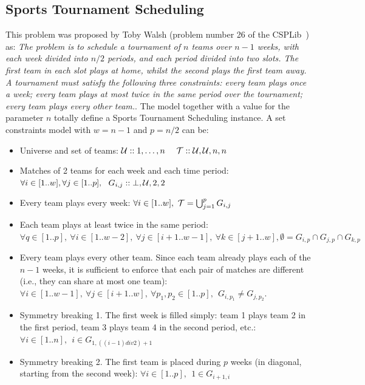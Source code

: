 \documentclass[3p,authoryear,times]{elsarticle}
\begin{document}
\subsection{Sports Tournament Scheduling}
\label{sts}
\color{red}
This problem was proposed by Toby Walsh (problem number 26 of the CSPLib~\cite{sts}) as: 
\textit{The problem is to schedule a tournament of $n$ teams over $n−1$ weeks, with each week divided into $n/2$ periods, and each period divided into two slots. The first team in each slot plays at home, whilst the second plays the first team away. A tournament must satisfy the following three constraints: every team plays once a week; every team plays at most twice in the same period over the tournament; every team plays every other team.}. 
The model together with a value for the parameter $n$ totally define a Sports Tournament Scheduling instance. 
A set constraints model with $w=n−1$ and $p=n/2$ can be:
\begin{itemize}
\item Universe and set of teams: ${\cal U}::1,\ldots,n~~~~{\cal T}::{\cal U},{\cal U},n,n$


\item{Matches of 2 teams for each week and each time period:}
$\forall i \in [1..w], \forall j \in [1..p], ~~ G_{i,j}::\bot,{\cal U},2,2 $

\item{Every team plays every week:} $\forall i \in [1..w],  ~{\cal T} = \bigcup_{j=1}^{p} G_{i,j} $


\item{Each team plays at least twice in the same period:}
$\forall q \in [1..p],  ~\forall i \in [1..w-2],  ~ \forall j \in [i+1..w-1],  ~ \forall k \in [j+1..w], \emptyset =  G_{i,p} \cap G_{j,p} \cap G_{k,p} $

\item{Every team plays every other team.} 
Since each team already plays each of the $n-1$ weeks, it is sufficient to enforce that each pair of matches are different (i.e., they can share at most one team):
$\forall i \in [1..w-1],  ~ \forall j \in [i+1..w],  ~ \forall p_1,p_2 \in [1..p], ~~ G_{i,p_1} \not = G_{j,p_2}$. 


\item{Symmetry breaking 1.} 
The first week is filled simply: team 1 plays team 2 in the first period, team 3 plays team 4 in the second period, etc.:
$\forall i \in [1..n], ~~ i \in   G_{1,((i-1) div 2)+1} $

\item{Symmetry breaking 2.} 
The first team is placed during $p$ weeks (in diagonal, starting from the second week):
$\forall i \in [1..p], ~~ 1 \in   G_{i+1,i}$
\end{itemize}
\color{black}
\end{document}
